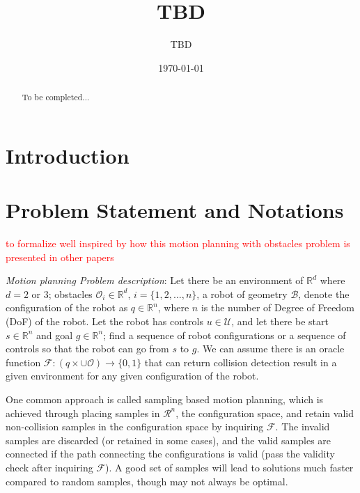 \documentclass[11pt]{article}
\begin{document}
\title{TBD}

\author{
TBD
}

\date{\today}

\maketitle

\begin {abstract}
To be completed...
\end{abstract}

\section{Introduction}\label{sec:introduction}



\section{Problem Statement and Notations}\label{sec:notations}

\textcolor{red}{to formalize well inspired by how this motion planning with obstacles problem is presented in other papers}

\noindent\textit{Motion planning Problem description}: Let there be an environment of $\mathbb{R}^d$ where $d = 2$ or $3$; obstacles $\mathcal{O}_i\in\mathbb{R}^d$, $i = \{1, 2, \ldots, n\}$, a robot of geometry $\mathcal{B}$, denote the configuration of the robot as $q\in\mathbb{R}^n$, where $n$ is the number of Degree of Freedom (DoF) of the robot. Let the robot has controls $u\in\mathcal{U}$, and let there be start $s\in\mathbb{R}^n$ and goal $g\in\mathbb{R}^n$; find a sequence of robot configurations or a sequence of controls so that the robot can go from $s$ to $g$. We can assume there is an oracle function $\mathcal{F}:(q\times \cup\mathcal{O})\rightarrow \{0, 1\}$ that can return collision detection result in a given environment for any given configuration of the robot. 

One common approach is called sampling based motion planning, which is achieved through placing samples in $\mathcal{R}^n$, the configuration space, and retain valid non-collision samples in the configuration space by inquiring $\mathcal{F}$. The invalid samples are discarded (or retained in some cases), and the valid samples are connected if the path connecting the configurations is valid (pass the validity check after inquiring $\mathcal{F}$). A good set of samples will lead to solutions much faster compared to random samples, though may not always be optimal. 
\end{document}
